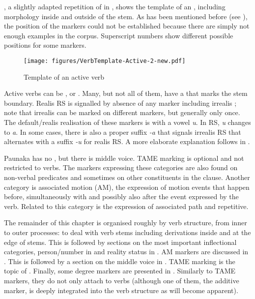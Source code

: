 , a slightly adapted repetition of  in , shows the template of an , including morphology inside and outside of the stem. As has been mentioned before (see ), the position of the  markers could not be established because there are simply not enough examples in the corpus. Superscript numbers show different possible positions for some markers.

\begin{figure}[!ht]

\texttt{[image: figures/VerbTemplate-Active-2-new.pdf]}
\caption{Template of an active verb}
\label{fig:VerbTemplate-Active}
\end{figure}

Active verbs can be ,  or . Many, but not all of them, have a  that marks the stem boundary. Realis RS is signalled by absence of any marker including irrealis ; note that irrealis can be marked on different markers, but generally only once. The default/realis realisation of these markers is with a vowel \textit{u}. In  RS, \textit{u} changes to \textit{a}. In some cases, there is also a proper suffix \textit{-a} that signals irrealis RS that alternates with a suffix \textit{-u} for realis RS. A more elaborate explanation follows in .

Paunaka has no , but there is middle voice. TAME marking is optional and not restricted to verbs. The markers expressing these categories are also found on non-verbal predicates and sometimes on other constituents in the clause. Another category is associated motion (AM), the expression of motion events that happen before, simultaneously with and possibly also after the event expressed by the verb. Related to this category is the expression of associated path and repetitive.

The remainder of this chapter is organised roughly by verb structure, from inner to outer processes:  to  deal with verb stems including derivations inside and at the edge of stems. This is followed by sections on the most important inflectional categories, person/number in  and reality status in . AM markers are discussed in . This is followed by a section on the middle voice in . TAME marking is the topic of . Finally, some degree markers are presented in . Similarly to TAME markers, they do not only attach to verbs (although one of them, the additive marker, is deeply integrated into the verb structure as will become apparent).


